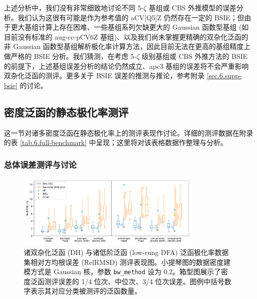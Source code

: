 上述分析中，我们没有非常细致地讨论不同 5-$\zeta$ 基组或 CBS 外推模型的误差分析。我们认为这很有可能是作为参考值的 aCV[Q5]Z 仍然存在一定的 BSIE；但由于更大基组计算上存在困难、一些基组系列欠缺更大的 Gaussian 函数型基组 (如目前没有标准的 aug-cc-pCV6Z 基组)、以及我们尚未掌握更精确的双杂化泛函的非 Gaussian 函数型基组解析极化率计算方法\cite{Brakestad-Frediani.JCTC.2020}，因此目前无法在更高的基组精度上做严格的 BSIE 分析。我们猜测，在考虑 5-$\zeta$ 级别基组或 CBS 外推方法的 BSIE 的前提下，上述基组误差分析的结论仍然成立、apc3 基组的误差将不会严重影响双杂化泛函的测评。更多关于 BSIE 误差的推测与推论，参考附录 \ref{sec.6.supp-bsie} 的讨论。

\subsection{密度泛函的静态极化率测评}
\label{sec.6.benchmark}

这一节对诸多密度泛函在静态极化率上的测评表现作讨论。详细的测评数据在附录的表 \ref{tab.6.full-benchmark} 中呈现；这里将对该表格数据作整理与分析。

\subsubsection{总体误差测评与讨论}

\begin{figure}[hp]
    \centering
    \caption{诸双杂化泛函 (DH) 与诸低阶泛函 (low-rung DFA) 泛函极化率数据集相对方均根误差 (RelRMSD) 测评表现图。小提琴图的数据密度建模方式是 Gaussian 核，参数 \texttt{bw\_method} 设为 0.2。箱型图展示了密度泛函测评误差的 1/4 位次、中位次、3/4 位次误差。图例中括号数字表示其对应分类被测评的泛函数量。}
    \label{fig.6.benchmark-compare-dh-low}
    \includegraphics[width=0.8\textwidth]{assets/benchmark-compare-dh-low.pdf}
\end{figure}

